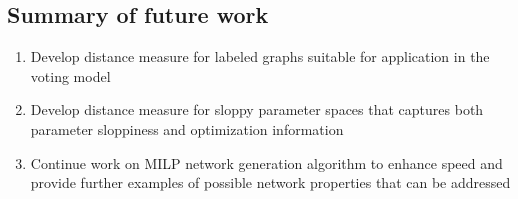 \documentclass[12pt]{article}
\begin{document}
\begin{spacing}{2.2}
\section*{Summary of future work}
\begin{enumerate}
\item Develop distance measure for labeled graphs suitable for application in the voting model
\item Develop distance measure for sloppy parameter spaces that captures both parameter sloppiness and optimization information
\item Continue work on MILP network generation algorithm to enhance speed and provide further examples of possible network properties that can be addressed
\end{enumerate}
\end{spacing}





\end{document}

